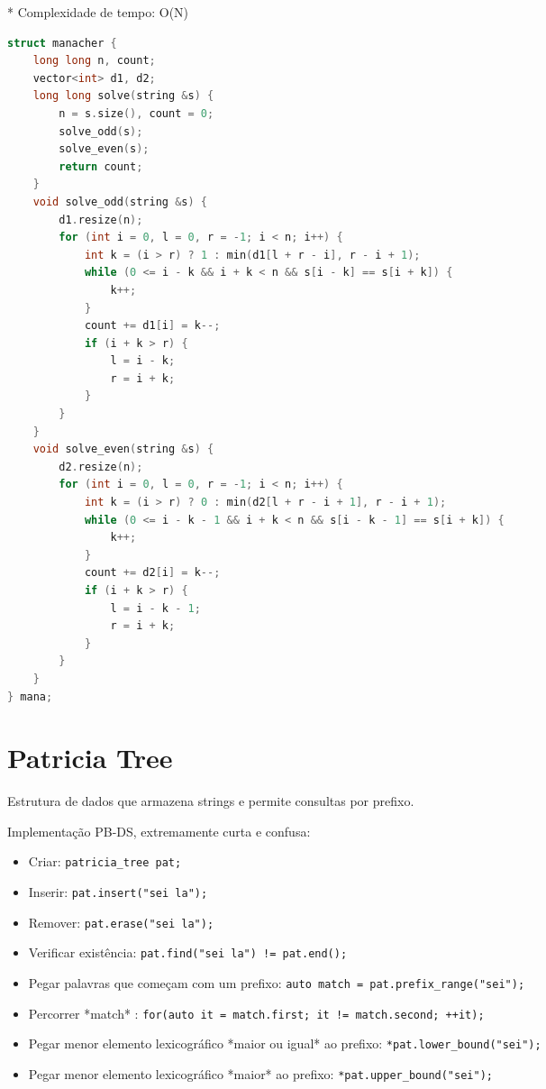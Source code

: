 \documentclass[11pt, a4paper, oneside]{book}
\begin{document}
* Complexidade de tempo: O(N)
\hfill

\begin{multicols}{2}
\begin{lstlisting}[language=C++]
struct manacher {
    long long n, count;
    vector<int> d1, d2;
    long long solve(string &s) {
        n = s.size(), count = 0;
        solve_odd(s);
        solve_even(s);
        return count;
    }
    void solve_odd(string &s) {
        d1.resize(n);
        for (int i = 0, l = 0, r = -1; i < n; i++) {
            int k = (i > r) ? 1 : min(d1[l + r - i], r - i + 1);
            while (0 <= i - k && i + k < n && s[i - k] == s[i + k]) {
                k++;
            }
            count += d1[i] = k--;
            if (i + k > r) {
                l = i - k;
                r = i + k;
            }
        }
    }
    void solve_even(string &s) {
        d2.resize(n);
        for (int i = 0, l = 0, r = -1; i < n; i++) {
            int k = (i > r) ? 0 : min(d2[l + r - i + 1], r - i + 1);
            while (0 <= i - k - 1 && i + k < n && s[i - k - 1] == s[i + k]) {
                k++;
            }
            count += d2[i] = k--;
            if (i + k > r) {
                l = i - k - 1;
                r = i + k;
            }
        }
    }
} mana;
\end{lstlisting}
\end{multicols}

\hfill

\section{Patricia Tree}


Estrutura de dados que armazena strings e permite consultas por prefixo.



Implementação PB-DS, extremamente curta e confusa:



\begin{itemize}
\item Criar: \lstinline{patricia_tree pat;}
\item Inserir: \lstinline{pat.insert("sei la");}
\item Remover: \lstinline{pat.erase("sei la");}
\item Verificar existência: \lstinline{pat.find("sei la") != pat.end();}
\item Pegar palavras que começam com um prefixo: \lstinline{auto match = pat.prefix_range("sei");}
\item Percorrer *match* : \lstinline{for(auto it = match.first; it != match.second; ++it);}
\item Pegar menor elemento lexicográfico *maior ou igual* ao prefixo: \lstinline{*pat.lower_bound("sei");}
\item Pegar menor elemento lexicográfico *maior* ao prefixo: \lstinline{*pat.upper_bound("sei");}
\end{itemize}
\end{document}
